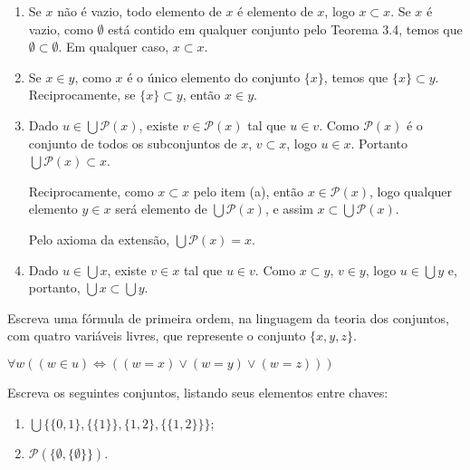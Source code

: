 \begin{enumerate}[label=(\alph{*})]
	\item 
		\begin{solucao} 
			Se $x$ não é vazio, todo elemento de $x$ é elemento de $x$, logo $x\subset x$. Se $x$ é vazio, como $\emptyset$ está contido em qualquer conjunto pelo Teorema 3.4, temos que $\emptyset\subset \emptyset$. Em qualquer caso, $x\subset x$. 
		\end{solucao}
	\item 
		\begin{solucao}
			Se $x\in y$, como $x$ é o único elemento do conjunto $\{x\}$, temos que $\{x\}\subset y$. Reciprocamente, se $\{x\}\subset y$, então $x\in y$.
		\end{solucao}
	\item 
		\begin{solucao}
			Dado $u\in\bigcup\mathcal{P}(x)$, existe $v\in\mathcal{P}(x)$ tal que $u\in v$. Como $\mathcal{P}(x)$ é o conjunto de todos os subconjuntos de $x$, $v\subset x$, logo $u\in x$. Portanto $\bigcup\mathcal{P}(x)\subset x$.
			
			Reciprocamente, como $x\subset x$ pelo item (a), então $x\in\mathcal{P}(x)$, logo qualquer elemento $y\in x$ será elemento de $\bigcup\mathcal{P}(x)$, e assim $x\subset \bigcup\mathcal{P}(x)$.
			
			Pelo axioma da extensão, $\bigcup\mathcal{P}(x)=x$.
		\end{solucao}
	\item 
		\begin{solucao}
			Dado $u\in\bigcup x$, existe $v\in x$ tal que $u\in v$. Como $x\subset y$, $v\in y$, logo $u\in\bigcup y$ e, portanto, $\bigcup x\subset\bigcup y$.
		\end{solucao}
\end{enumerate}


\begin{exercicio}
	Escreva uma fórmula de primeira ordem, na linguagem da teoria dos conjuntos, com quatro variáveis livres, que represente o conjunto $\{x,y,z\}$.
\end{exercicio}
\begin{solucao}
	$\forall w ((w \in u) \iff ((w=x) \vee (w=y) \vee (w=z)))$
\end{solucao}

\begin{exercicio}
	Escreva os seguintes conjuntos, listando seus elementos entre chaves:
	\begin{enumerate}[label=(\alph{*})]
		\item $\bigcup\{\{0,1\},\{\{1\}\},\{1,2\},\{\{1,2\}\}\}$;
		\item $\mathcal{P}(\{\emptyset,\{\emptyset\}\})$.
	\end{enumerate}
\end{exercicio}

